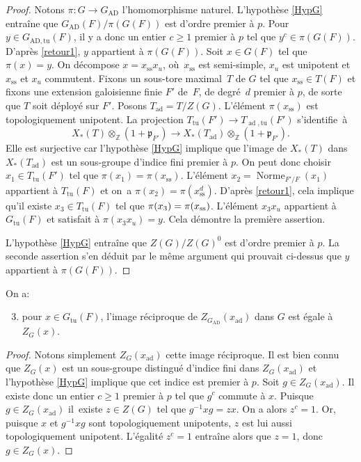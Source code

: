 \documentclass[JEP,XML,SOM,Unicode,francais]{cedram}
\newcommand{\frp}{\mathfrak{p}}
\newcommand{\AD}{\mathrm{AD}}
\newcommand{\rss}{\mathrm{ss}}
\newcommand{\tu}{\mathrm{tu}}
\DeclareMathOperator{\ad}{ad}
\DeclareMathOperator{\Norme}{Norme}
\newcommand{\ZZ}{\mathbb{Z}}
\theoremstyle{plain}
\theoremstyle{definition}
\begin{document}
\begin{proof}
Notons $\pi:G\to G_{\AD}$ l'homomorphisme naturel. L'hypothèse \ref{HypG} entraîne que $G_{\AD}(F)/\pi(G(F))$ est d'ordre premier à $p$. Pour $y\in G_{\AD,\tu}(F)$, il y a donc un entier $c\geq1$ premier à $p$ tel que $y^c\in \pi(G(F))$. D'après \eqref{retour1}, $y$ appartient à $\pi(G(F))$. Soit $x\in G(F)$ tel que $\pi(x)=y$. On décompose $x=x_{\rss}x_{u}$, où~$x_{\rss}$ est semi-simple, $x_{u}$ est unipotent et $x_{\rss}$ et $x_{u}$ commutent. Fixons un sous-tore maximal~$T$ de $G$ tel que $x_{\rss}\in T(F)$ et fixons une extension galoisienne finie $F'$ de~$F$, de degré~$d$ premier à $p$, de sorte que $T$ soit déployé sur $F'$. Posons $T_{\ad}=T/Z(G)$. L'élément $\pi(x_{\rss})$ est topologiquement unipotent. La projection $T_{\tu}(F')\to T_{\ad,\tu}(F')$ s'identifie~à
\[
X_{*}(T)\otimes_{\ZZ}(1+\frp_{F'})\to X_{*}(T_{\ad})\otimes_{\ZZ}(1+\frp_{F'}).
\]
Elle est surjective car l'hypothèse \ref{HypG} implique que l'image de $X_{*}(T)$ dans $X_{*}(T_{\ad})$ est un sous-groupe d'indice fini premier à $p$.
On peut donc choisir \hbox{$x_{1}\!\in\!T_{\tu}(F')$} tel que $\pi(x_{1})=\pi(x_{\rss})$. L'élément $x_{2}=\Norme_{F'/F}(x_{1})$ appartient à $T_{\tu}(F)$ et on~a $\pi(x_{2})=\pi(x_{\rss}^d)$. D'après \eqref{retour1}, cela implique qu'il existe $x_{3}\in T_{\tu}(F)$ tel que $\pi(x_{3})=\nobreak\pi(x_{\rss})$. L'élément $x_{3}x_{u}$ appartient à $G_{\tu}(F)$ et satisfait à $\pi(x_{3}x_{u})=y$. Cela démontre la première assertion.

L'hypothèse \ref{HypG} entraîne que $Z(G)/Z(G)^0$ est d'ordre premier à $p$. La seconde assertion s'en déduit par le même argument qui prouvait ci-dessus que $y$ appartient à $\pi(G(F))$.
\end{proof}

On a:
\begin{enumerate}\setcounter{enumi}{2}
\item\label{retour3}
pour $x\in G_{\tu}(F)$, l'image réciproque de $Z_{G_{\AD}}(x_{\ad})$ dans $G$ est égale à $Z_{G}(x)$.
\end{enumerate}

\begin{proof}
Notons simplement $Z_{G}(x_{\ad})$ cette image réciproque. Il est bien connu que $Z_{G}(x)$ est un sous-groupe distingué d'indice fini dans $Z_{G}(x_{\ad})$ et l'hypothèse \ref{HypG} implique que cet indice est premier à $p$. Soit $g\in Z_{G}(x_{\ad})$. Il existe donc un entier $c\geq1$ premier à $p$ tel que $g^c$ commute à $x$. Puisque $g\in Z_{G}(x_{\ad})$ il~existe $z\in Z(G)$ tel que $ g^{-1}xg=zx$. On a alors $z^c=1$. Or, puisque $x$ et $g^{-1}xg$ sont topologiquement unipotents, $z$ est lui aussi topologiquement unipotent. L'égalité $z^c=1$ entraîne alors que $z=1$, donc $g\in Z_{G}(x)$.
\end{proof}
\end{document}
